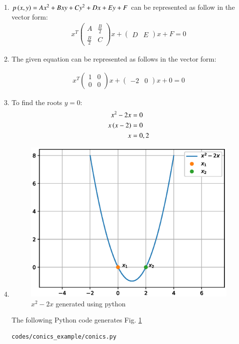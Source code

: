 \renewcommand{\theequation}{\theenumi}
\begin{enumerate}[label=\thesubsection.\arabic*.,ref=\thesubsection.\theenumi]

\item \solution $p\left(x, y\right) = Ax^2 + Bxy + Cy^2 + Dx + Ey + F$ can be represented as follow in the vector form:
\begin{align}
x^T 
\begin{pmatrix}
A & \frac{B}{2} \\
\frac{B}{2} & C
\end{pmatrix}
x + 
\begin{pmatrix}
D & E 
\end{pmatrix}
x + F = 0
\end{align}

\item \begin{flushleft}
The given equation can be represented as follows in the vector form:
\end{flushleft}
\begin{align}
x^T 
\begin{pmatrix}
1 & 0 \\
0 & 0
\end{pmatrix}
x + 
\begin{pmatrix}
-2 & 0 
\end{pmatrix}
x + 0 = 0
\end{align}

\item To find the roots $y=0$:
\begin{align}
x^2 - 2x &= 0 \\
x\left(x-2\right) &= 0 \\
x &= 0,2
\end{align}

\item \begin{figure}[!ht]
\centering
\includegraphics[width=\columnwidth]{./figs/conics_example/quadratic_equation.eps}
\caption{$x^2 -2x$ generated using python}
\label{fig:quadeq_conics_example}
\end{figure} 
The  following Python code generates Fig. \ref{fig:quadeq_conics_example}

\begin{lstlisting}
codes/conics_example/conics.py
\end{lstlisting}
\end{enumerate}